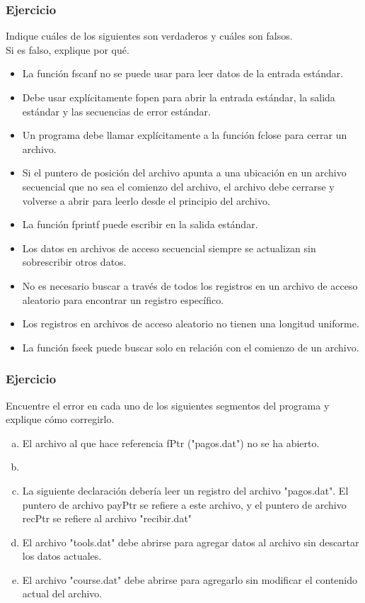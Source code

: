 \subsubsection{Ejercicio}
Indique cuáles de los siguientes son verdaderos y cuáles son falsos.\\
Si es falso, explique por qué.
\begin{itemize}[a)]
  \item La función fscanf no se puede usar para leer datos de la entrada estándar.
  \item Debe usar explícitamente fopen para abrir la entrada estándar, la salida estándar y las secuencias de error estándar.
  \item Un programa debe llamar explícitamente a la función fclose para cerrar un archivo.
  \item Si el puntero de posición del archivo apunta a una ubicación en un archivo secuencial que no sea el comienzo del archivo, el archivo debe cerrarse y volverse a abrir para leerlo desde el principio del archivo.
  \item La función fprintf puede escribir en la salida estándar.
  \item Los datos en archivos de acceso secuencial siempre se actualizan sin sobrescribir otros datos.
  \item No es necesario buscar a través de todos los registros en un archivo de acceso aleatorio para encontrar un registro específico.
  \item Los registros en archivos de acceso aleatorio no tienen una longitud uniforme.
  \item La función fseek puede buscar solo en relación con el comienzo de un archivo.
\end{itemize}

\subsubsection{Ejercicio}
Encuentre el error en cada uno de los siguientes segmentos del programa y explique cómo corregirlo.
\begin{enumerate}[a)]
  \item El archivo al que hace referencia fPtr ("pagos.dat") no se ha abierto.
    \lstset{inputencoding=utf8/latin1}
    
  \item \ \ \ 
    
  \item La siguiente declaración debería leer un registro del archivo "pagos.dat". 
    El puntero de archivo payPtr se refiere a este archivo, y el puntero de archivo recPtr se refiere al archivo "recibir.dat"
    
  \item El archivo "tools.dat" debe abrirse para agregar datos al archivo sin descartar los datos actuales.
    
  \item El archivo "course.dat" debe abrirse para agregarlo sin modificar el contenido actual del archivo.
    
\end{enumerate}




